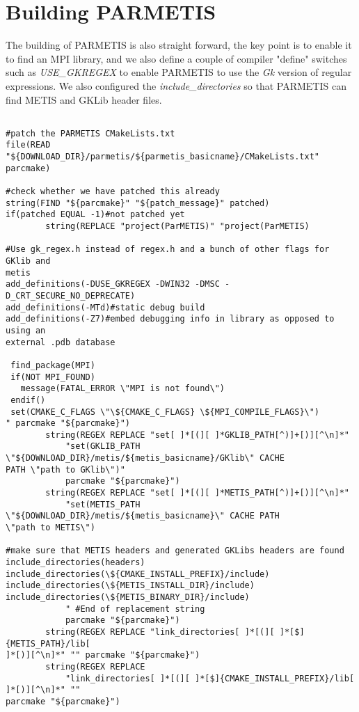 \documentclass[10pt,a4paper]{article}
\begin{document}
\section{Building PARMETIS}
The building of PARMETIS is also straight forward, the key point is to enable it
to find an MPI library, and we also define a couple of compiler "define"
switches such as \textit{USE\_GKREGEX} to enable PARMETIS to use the \textit{Gk}
version of regular expressions. We also configured the
\textit{include\_directories} so that PARMETIS can find METIS and GKLib header
files.

\begin{codeparchment}
\begin{lstlisting}

#patch the PARMETIS CMakeLists.txt
file(READ "${DOWNLOAD_DIR}/parmetis/${parmetis_basicname}/CMakeLists.txt"
parcmake)

#check whether we have patched this already
string(FIND "${parcmake}" "${patch_message}" patched)
if(patched EQUAL -1)#not patched yet
		string(REPLACE "project(ParMETIS)" "project(ParMETIS)

#Use gk_regex.h instead of regex.h and a bunch of other flags for GKlib and
metis
add_definitions(-DUSE_GKREGEX -DWIN32 -DMSC -D_CRT_SECURE_NO_DEPRECATE)
add_definitions(-MTd)#static debug build
add_definitions(-Z7)#embed debugging info in library as opposed to using an
external .pdb database

 find_package(MPI)
 if(NOT MPI_FOUND)
   message(FATAL_ERROR \"MPI is not found\")
 endif()
 set(CMAKE_C_FLAGS \"\${CMAKE_C_FLAGS} \${MPI_COMPILE_FLAGS}\")
" parcmake "${parcmake}")
  		string(REGEX REPLACE "set[ ]*[(][ ]*GKLIB_PATH[^)]+[)][^\n]*" 
  			"set(GKLIB_PATH \"${DOWNLOAD_DIR}/metis/${metis_basicname}/GKlib\" CACHE
PATH \"path to GKlib\")"
  			parcmake "${parcmake}")
  		string(REGEX REPLACE "set[ ]*[(][ ]*METIS_PATH[^)]+[)][^\n]*" 
  			"set(METIS_PATH \"${DOWNLOAD_DIR}/metis/${metis_basicname}\" CACHE PATH
\"path to METIS\")

#make sure that METIS headers and generated GKLibs headers are found
include_directories(headers)
include_directories(\${CMAKE_INSTALL_PREFIX}/include)
include_directories(\${METIS_INSTALL_DIR}/include)
include_directories(\${METIS_BINARY_DIR}/include)
  			" #End of replacement string
  			parcmake "${parcmake}")
		string(REGEX REPLACE "link_directories[ ]*[(][ ]*[$]{METIS_PATH}/lib[
]*[)][^\n]*" "" parcmake "${parcmake}")
		string(REGEX REPLACE 
			"link_directories[ ]*[(][ ]*[$]{CMAKE_INSTALL_PREFIX}/lib[ ]*[)][^\n]*" ""
parcmake "${parcmake}")
		

\end{lstlisting}
\end{codeparchment}
\end{document}
